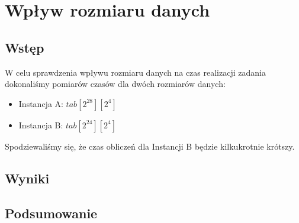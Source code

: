 \section{Wpływ rozmiaru danych}

\subsection{Wstęp}

W celu sprawdzenia wpływu rozmiaru danych na czas realizacji zadania dokonaliśmy pomiarów czasów dla dwóch rozmiarów danych:

\begin{itemize}
\item Instancja A: $tab[2^{28}][2^4]$
\item Instancja B: $tab[2^{24}][2^4]$
\end{itemize}

Spodziewaliśmy się, że czas obliczeń dla Instancji B będzie kilkukrotnie krótszy.

\subsection{Wyniki}

\subsection{Podsumowanie}
